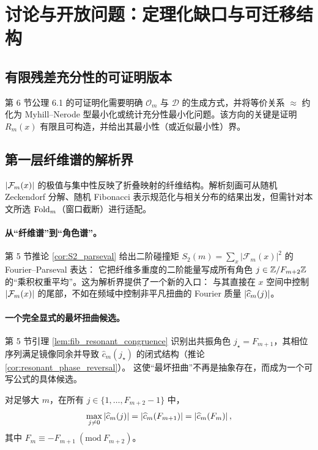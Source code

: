 \section{讨论与开放问题：定理化缺口与可迁移结构}

\subsection{有限残差充分性的可证明版本}

第 6 节公理 6.1 的可证明化需要明确 $\mathcal O_m$ 与 $\mathcal D$ 的生成方式，并将等价关系 $\approx$ 约化为 Myhill--Nerode 型最小化或统计充分性最小化问题。该方向的关键是证明 $R_m(x)$ 有限且可构造，并给出其最小性（或近似最小性）界。

\subsection{第一层纤维谱的解析界}

$\left\lvert \mathcal F_m(x)\right\rvert$ 的极值与集中性反映了折叠映射的纤维结构。解析刻画可从随机 Zeckendorf 分解、随机 Fibonacci 表示规范化与相关分布的结果出发，但需针对本文所选 $\mathrm{Fold}_m$（窗口截断）进行适配。\cite{kkmw_zeckendorf_summands}

\paragraph{从“纤维谱”到“角色谱”。}
第 5 节推论 \ref{cor:S2_parseval} 给出二阶碰撞矩 $S_2(m)=\sum_x|\mathcal F_m(x)|^2$ 的 Fourier--Parseval 表达：
它把纤维多重度的二阶能量写成所有角色 $j\in\mathbb{Z}/F_{m+2}\mathbb{Z}$ 的“乘积权重平均”。这为解析界提供了一个新的入口：
与其直接在 $x$ 空间中控制 $\left\lvert \mathcal F_m(x)\right\rvert$ 的尾部，不如在频域中控制非平凡扭曲的 Fourier 质量 $\left\lvert \widehat c_m(j)\right\rvert$。

\paragraph{一个完全显式的最坏扭曲候选。}
第 5 节引理 \ref{lem:fib_resonant_congruence} 识别出共振角色 $j_\star=F_{m+1}$，其相位序列满足镜像同余并导致 $\widehat c_m(j_\star)$ 的闭式结构（推论 \ref{cor:resonant_phase_reversal}）。
这使“最坏扭曲”不再是抽象存在，而成为一个可写公式的具体候选。

\begin{conjecture}\label{conj:max_fourier_at_fib_resonance}
\MatchTag
对足够大 $m$，在所有 $j\in\{1,\dots,F_{m+2}-1\}$ 中，
$$
\max_{j\ne 0}\left\lvert \widehat c_m(j)\right\rvert
=\left\lvert \widehat c_m(F_{m+1})\right\rvert
=\left\lvert \widehat c_m(F_m)\right\rvert,
$$
其中 $F_m\equiv -F_{m+1}\ (\mathrm{mod}\ F_{m+2})$。
\end{conjecture}

